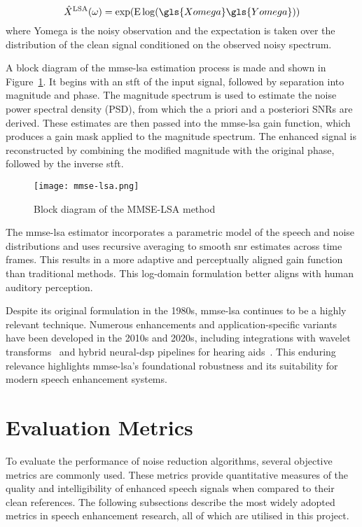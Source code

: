 \begin{equation}
    \hat{X}^{\text{LSA}}(\omega) =\exp (\mathrm{E} \log(\gls{Xomega} \gls{Yomega}))
\end{equation}
where \gls{Yomega} is the noisy observation and the expectation is taken over the distribution of the clean signal conditioned on the observed noisy spectrum.

A block diagram of the \gls{mmse-lsa} estimation process is made and shown in Figure~\ref{fig:mmse_lsa_block}. It begins with an \gls{stft} of the input signal, followed by separation into magnitude and phase. The magnitude spectrum is used to estimate the noise power spectral density (PSD), from which the a priori and a posteriori SNRs are derived. These estimates are then passed into the \gls{mmse-lsa} gain function, which produces a gain mask applied to the magnitude spectrum. The enhanced signal is reconstructed by combining the modified magnitude with the original phase, followed by the inverse \gls{stft}.

\begin{figure}[H]
    \centering
    \texttt{[image: mmse-lsa.png]}
    \caption{\label{fig:mmse_lsa_block} Block diagram of the MMSE-LSA method}
\end{figure}

The \gls{mmse-lsa} estimator incorporates a parametric model of the speech and noise distributions and uses recursive averaging to smooth \gls{snr} estimates across time frames. This results in a more adaptive and perceptually aligned gain function than traditional methods. This log-domain formulation better aligns with human auditory perception.

Despite its original formulation in the 1980s, \gls{mmse-lsa} continues to be a highly relevant technique. Numerous enhancements and application-specific variants have been developed in the 2010s and 2020s, including integrations with wavelet transforms~\cite{wei2016mmse} and hybrid neural-\gls{dsp} pipelines for hearing aids~\cite{sugahara2024hybrid}. This enduring relevance highlights \gls{mmse-lsa}'s foundational robustness and its suitability for modern speech enhancement systems.

\section{Evaluation Metrics}
\label{sec:evaluation_metrics}

To evaluate the performance of noise reduction algorithms, several objective metrics are commonly used. These metrics provide quantitative measures of the quality and intelligibility of enhanced speech signals when compared to their clean references. The following subsections describe the most widely adopted metrics in speech enhancement research, all of which are utilised in this project.

